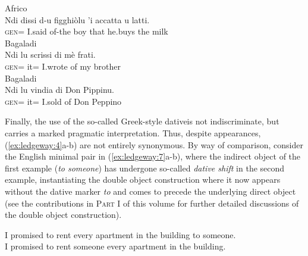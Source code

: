 \documentclass[output=paper,modfonts,nonflat,colorlinks,citecolor=brown]{langsci/langscibook}
\begin{document}
\ea\label{ex:ledgeway:6}
\ea Africo\\
	\gll Ndi  dissi  d-u  figghiòlu  ’i  accatta  u  latti.\\
      \textsc{gen}=  I.said  of-the  boy  that  he.buys  the  milk\\

\ex Bagaladi\\
	\gll Ndi  lu  scrissi  di  mè  frati.\\
      \textsc{gen}=  it=    I.wrote  of  my  brother\\

\ex  Bagaladi\\
	\gll Ndi  lu  vindia  di  Don  Pippinu.\\
      \textsc{gen}=  it=  I.sold  of  Don  Peppino\\
      \z
      \z
      

Finally, the use of the so-called Greek-style dativeis not indiscriminate, but carries a marked pragmatic interpretation. Thus, despite appearances, (\ref{ex:ledgeway:4}a-b) are not entirely synonymous. By way of comparison, consider the English minimal pair in (\ref{ex:ledgeway:7}a-b), where the indirect object of the first example (\textit{to someone}) has undergone so-called \textit{dative shift} in the second example, instantiating the double object construction where it now appears without the dative marker \textit{to} and comes to precede the underlying direct object (see the contributions in \textsc{Part I} of this volume for further detailed discussions of the double object construction).

\ea\label{ex:ledgeway:7}
\ea
 I promised to rent every apartment in the building to someone.\\
\ex
I promised to rent someone every apartment in the building.\\
\z
\z
\end{document}
